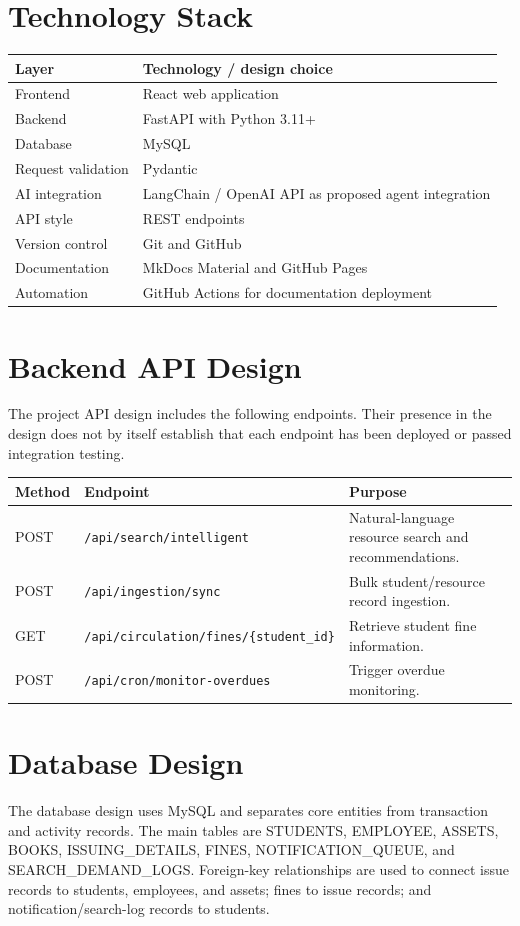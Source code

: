 \documentclass[12pt,a4paper]{report}
\begin{document}
\section{Technology Stack}
\begin{longtable}{p{3.2cm}p{9cm}}
\toprule
\textbf{Layer} & \textbf{Technology / design choice}\\
\midrule
Frontend & React web application\\
Backend & FastAPI with Python 3.11+\\
Database & MySQL\\
Request validation & Pydantic\\
AI integration & LangChain / OpenAI API as proposed agent integration\\
API style & REST endpoints\\
Version control & Git and GitHub\\
Documentation & MkDocs Material and GitHub Pages\\
Automation & GitHub Actions for documentation deployment\\
\bottomrule
\end{longtable}

\section{Backend API Design}
The project API design includes the following endpoints. Their presence in the design does not by itself establish that each endpoint has been deployed or passed integration testing.

\begin{longtable}{p{2cm}p{5.5cm}p{4.7cm}}
\toprule
\textbf{Method} & \textbf{Endpoint} & \textbf{Purpose}\\
\midrule
POST & \texttt{/api/search/intelligent} & Natural-language resource search and recommendations.\\
POST & \texttt{/api/ingestion/sync} & Bulk student/resource record ingestion.\\
GET & \texttt{/api/circulation/fines/\{student\_id\}} & Retrieve student fine information.\\
POST & \texttt{/api/cron/monitor-overdues} & Trigger overdue monitoring.\\
\bottomrule
\end{longtable}

\section{Database Design}
The database design uses MySQL and separates core entities from transaction and activity records. The main tables are STUDENTS, EMPLOYEE, ASSETS, BOOKS, ISSUING\_DETAILS, FINES, NOTIFICATION\_QUEUE, and SEARCH\_DEMAND\_LOGS. Foreign-key relationships are used to connect issue records to students, employees, and assets; fines to issue records; and notification/search-log records to students.
\end{document}
